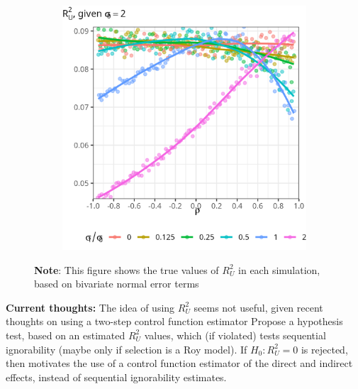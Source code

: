 \documentclass[a4paper, 12pt]{article}                                     %
\begin{document}
\begin{figure}[H]
\begin{subfigure}[b]{0.495\textwidth}
        \includegraphics[width=\textwidth]{sim-output/R2Uvar-D.png}
        \label{fig:R2Uvar-D}
    \end{subfigure}
    \label{fig:R2U}
    \vspace{-1cm}
    \justify
    \footnotesize
    \textbf{Note}:
    This figure shows the true values of $R^2_U$ in each simulation, based on bivariate normal error terms
\end{figure}

\textbf{Current thoughts:}
The idea of using $R^2_U$ seems not useful, given recent thoughts on using a two-step control function estimator  
Propose a hypothesis test, based on an estimated $R^2_U$ values, which (if violated) tests sequential ignorability (maybe only if selection is a Roy model).
If $H_0: R^2_U = 0$ is rejected, then motivates the use of a control function estimator of the direct and indirect effects, instead of sequential ignorability estimates.


\singlespacing


\end{document}
